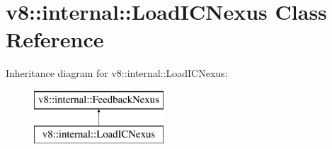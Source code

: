 \hypertarget{classv8_1_1internal_1_1_load_i_c_nexus}{}\section{v8\+:\+:internal\+:\+:Load\+I\+C\+Nexus Class Reference}
\label{classv8_1_1internal_1_1_load_i_c_nexus}
Inheritance diagram for v8\+:\+:internal\+:\+:Load\+I\+C\+Nexus\+:\begin{figure}[H]
\begin{center}
\leavevmode
\includegraphics[height=2.000000cm]{classv8_1_1internal_1_1_load_i_c_nexus}
\end{center}
\end{figure}
